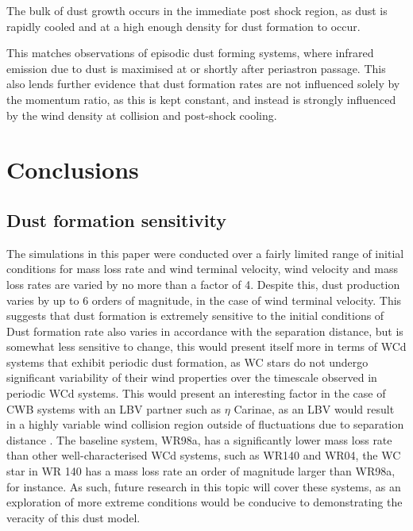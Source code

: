 The bulk of dust growth occurs in the immediate post shock region, as dust is rapidly cooled and at a high enough density for dust formation to occur.

This matches observations of episodic dust forming systems, where infrared emission due to dust is maximised at or shortly after periastron passage. This also lends further evidence that dust formation rates are not influenced solely by the momentum ratio, as this is kept constant, and instead is strongly influenced by the wind density at collision and post-shock cooling. 



\section{Conclusions}



\subsection{Dust formation sensitivity}

The simulations in this paper were conducted over a fairly limited range of initial conditions for mass loss rate and wind terminal velocity, wind velocity and mass loss rates are varied by no more than a factor of 4.
Despite this, dust production varies by up to 6 orders of magnitude, in the case of wind terminal velocity.
This suggests that dust formation is extremely sensitive to the initial conditions of 
Dust formation rate also varies in accordance with the separation distance, but is somewhat less sensitive to change, this would present itself more in terms of WCd systems that exhibit periodic dust formation, as WC stars do not undergo significant variability of their wind properties over the timescale observed in periodic WCd systems.
This would present an interesting factor in the case of CWB systems with an LBV partner such as $\eta$ Carinae, as an LBV would result in a highly variable wind collision region outside of fluctuations due to separation distance \parencite{nazeChangingWindCollision2018}.
The baseline system, WR98a, has a significantly lower mass loss rate than other well-characterised WCd systems, such as WR140 and WR04, the WC star in WR 140 has a mass loss rate an order of magnitude larger than WR98a, for instance.
As such, future research in this topic will cover these systems, as an exploration of more extreme conditions would be conducive to demonstrating the veracity of this dust model.

